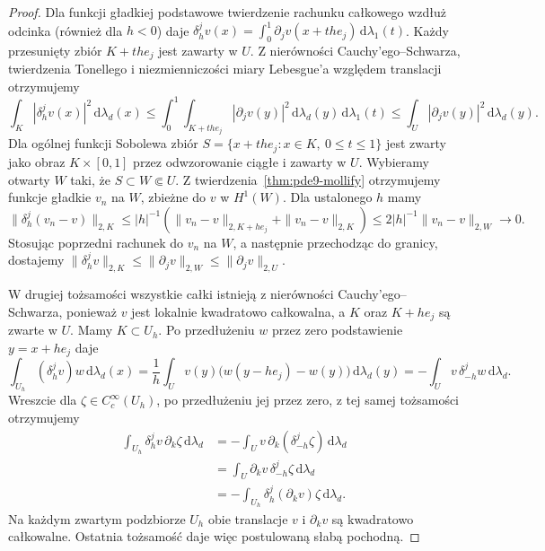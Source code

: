 \begin{proof}
Dla funkcji gładkiej podstawowe twierdzenie rachunku całkowego
wzdłuż odcinka (również dla $h<0$) daje
$\delta_h^jv(x)=\int_0^1\partial_jv(x+the_j)\,
\mathrm d\lambda_1(t)$. Każdy przesunięty zbiór
$K+the_j$ jest zawarty w $U$. Z nierówności Cauchy'ego--Schwarza,
twierdzenia Tonellego i niezmienniczości miary Lebesgue'a
względem translacji otrzymujemy
\[
 \int_K|\delta_h^jv(x)|^2\,\mathrm d\lambda_d(x)
 \le\int_0^1\int_{K+the_j}|\partial_jv(y)|^2\,
 \mathrm d\lambda_d(y)\,\mathrm d\lambda_1(t)
 \le\int_U|\partial_jv(y)|^2\,\mathrm d\lambda_d(y).
\]
Dla ogólnej funkcji Sobolewa zbiór
$S=\{x+the_j:x\in K,\ 0\le t\le1\}$ jest zwarty jako obraz
$K\times[0,1]$ przez odwzorowanie ciągłe i zawarty w $U$.
Wybieramy otwarty $W$ taki, że $S\subset W\Subset U$.
Z twierdzenia~\ref{thm:pde9-mollify} otrzymujemy funkcje
gładkie $v_n$ na $W$, zbieżne do $v$ w $H^1(W)$.
Dla ustalonego $h$ mamy
\[
 \|\delta_h^j(v_n-v)\|_{2,K}
 \le |h|^{-1}(\|v_n-v\|_{2,K+he_j}
                  +\|v_n-v\|_{2,K})
 \le 2|h|^{-1}\|v_n-v\|_{2,W}\longrightarrow0.
\]
Stosując poprzedni rachunek do $v_n$ na $W$, a następnie
przechodząc do granicy, dostajemy
$\|\delta_h^jv\|_{2,K}\le\|\partial_jv\|_{2,W}
\le\|\partial_jv\|_{2,U}$.

W drugiej tożsamości wszystkie całki istnieją z nierówności
Cauchy'ego--Schwarza, ponieważ $v$ jest lokalnie kwadratowo
całkowalna, a $K$ oraz $K+he_j$ są zwarte w $U$.
Mamy $K\subset U_h$. Po przedłużeniu $w$ przez zero
podstawienie $y=x+he_j$ daje
\[
 \int_{U_h}(\delta_h^jv)w\,\mathrm d\lambda_d(x)
 =\frac1h\int_U v(y)\bigl(w(y-he_j)-w(y)\bigr)
 \,\mathrm d\lambda_d(y)
 =-\int_U v\,\delta_{-h}^jw\,\mathrm d\lambda_d.
\]
Wreszcie dla $\zeta\in C_c^\infty(U_h)$, po przedłużeniu
jej przez zero, z tej samej tożsamości otrzymujemy
\begin{align*}
 \int_{U_h}\delta_h^jv\,\partial_k\zeta\,\mathrm d\lambda_d
 &=-\int_U v\,\partial_k(\delta_{-h}^j\zeta)\,\mathrm d\lambda_d\\
 &=\int_U \partial_kv\,\delta_{-h}^j\zeta\,\mathrm d\lambda_d\\
 &=-\int_{U_h}\delta_h^j(\partial_kv)\zeta\,\mathrm d\lambda_d.
\end{align*}
Na każdym zwartym podzbiorze $U_h$ obie translacje
$v$ i $\partial_kv$ są kwadratowo całkowalne.
Ostatnia tożsamość daje więc postulowaną słabą pochodną.
\end{proof}

